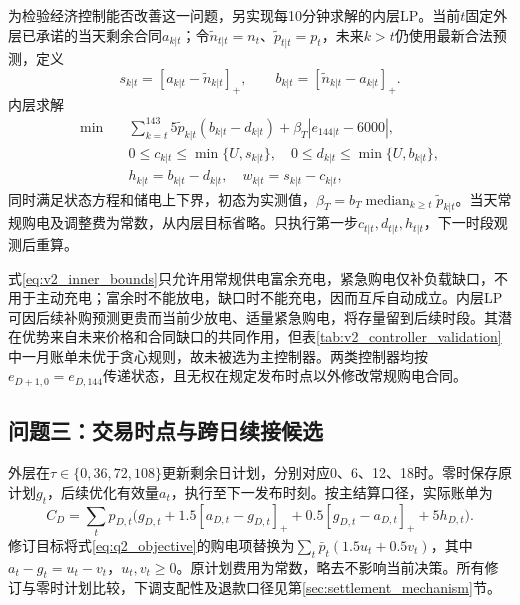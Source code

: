 为检验经济控制能否改善这一问题，另实现每10分钟求解的内层LP。当前$t$固定外层已承诺的当天剩余合同$a_{k|t}$；令$\widetilde n_{t|t}=n_t$、$\widetilde p_{t|t}=p_t$，未来$k>t$仍使用最新合法预测，定义
\begin{equation}
 s_{k|t}=[a_{k|t}-\widetilde n_{k|t}]_+,\qquad
 b_{k|t}=[\widetilde n_{k|t}-a_{k|t}]_+.
 \label{eq:v2_surplus_deficit}
\end{equation}
内层求解
\begin{align}
 \min\quad&\sum_{k=t}^{143}5\widetilde p_{k|t}(b_{k|t}-d_{k|t})
             +\beta_T|e_{144|t}-6000|,\label{eq:v2_inner_objective}\\
 &0\le c_{k|t}\le\min\{U,s_{k|t}\},\quad
 0\le d_{k|t}\le\min\{U,b_{k|t}\},\label{eq:v2_inner_bounds}\\
 &h_{k|t}=b_{k|t}-d_{k|t},\quad w_{k|t}=s_{k|t}-c_{k|t},\label{eq:v2_inner_balance}
\end{align}
同时满足状态方程和储电上下界，初态为实测值，$\beta_T=b_T\operatorname{median}_{k\ge t}\widetilde p_{k|t}$。当天常规购电及调整费为常数，从内层目标省略。只执行第一步$c_{t|t},d_{t|t},h_{t|t}$，下一时段观测后重算。

式\eqref{eq:v2_inner_bounds}只允许用常规供电富余充电，紧急购电仅补负载缺口，不用于主动充电；富余时不能放电，缺口时不能充电，因而互斥自动成立。内层LP可因后续补购预测更贵而当前少放电、适量紧急购电，将存量留到后续时段。其潜在优势来自未来价格和合同缺口的共同作用，但表\ref{tab:v2_controller_validation}中一月账单未优于贪心规则，故未被选为主控制器。两类控制器均按$e_{D+1,0}=e_{D,144}$传递状态，且无权在规定发布时点以外修改常规购电合同。



\subsection{问题三：交易时点与跨日续接候选}

外层在$\tau\in\{0,36,72,108\}$更新剩余日计划，分别对应0、6、12、18时。零时保存原计划$g_t$，后续优化有效量$a_t$，执行至下一发布时刻。按主结算口径，实际账单为
\begin{equation}
 C_D=\sum_tp_{D,t}\big(g_{D,t}+1.5[a_{D,t}-g_{D,t}]_+
 +0.5[g_{D,t}-a_{D,t}]_++5h_{D,t}\big).
 \label{eq:settlement}
\end{equation}
修订目标将式\eqref{eq:q2_objective}的购电项替换为$\sum_t\bar p_t(1.5u_t+0.5v_t)$，其中$a_t-g_t=u_t-v_t$，$u_t,v_t\ge0$。原计划费用为常数，略去不影响当前决策。所有修订与零时计划比较，下调支配性及退款口径见第\ref{sec:settlement_mechanism}节。

